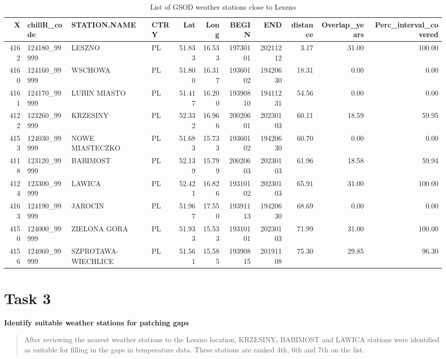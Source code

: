 \documentclass[
]{book}
\begin{document}
\begin{table}

\caption{\label{tab:unnamed-chunk-33}List of GSOD weather stations close to Leszno}
\fontsize{10}{12}\selectfont
\begin{tabular}[t]{r|l|l|l|r|r|r|r|r|r|r}
\hline
X & chillR\_code & STATION.NAME & CTRY & Lat & Long & BEGIN & END & distance & Overlap\_years & Perc\_interval\_covered\\
\hline
4162 & 124180\_99999 & LESZNO & PL & 51.833 & 16.533 & 19730101 & 20211212 & 3.17 & 31.00 & 100.00\\
\hline
4160 & 124160\_99999 & WSCHOWA & PL & 51.800 & 16.317 & 19360102 & 19420630 & 18.31 & 0.00 & 0.00\\
\hline
4161 & 124170\_99999 & LUBIN MIASTO & PL & 51.417 & 16.200 & 19390810 & 19411231 & 54.56 & 0.00 & 0.00\\
\hline
4122 & 123260\_99999 & KRZESINY & PL & 52.332 & 16.966 & 20020601 & 20230103 & 60.11 & 18.59 & 59.95\\
\hline
4153 & 124030\_99999 & NOWE MIASTECZKO & PL & 51.683 & 15.733 & 19360102 & 19420630 & 60.70 & 0.00 & 0.00\\
\hline
4118 & 123120\_99999 & BABIMOST & PL & 52.139 & 15.799 & 20020603 & 20230103 & 61.96 & 18.58 & 59.94\\
\hline
4124 & 123300\_99999 & LAWICA & PL & 52.421 & 16.826 & 19310102 & 20230103 & 65.91 & 31.00 & 100.00\\
\hline
4163 & 124190\_99999 & JAROCIN & PL & 51.967 & 17.550 & 19391113 & 19420630 & 68.69 & 0.00 & 0.00\\
\hline
4150 & 124000\_99999 & ZIELONA GORA & PL & 51.933 & 15.533 & 19310101 & 20230103 & 71.99 & 31.00 & 100.00\\
\hline
4156 & 124060\_99999 & SZPROTAWA-WIECHLICE & PL & 51.561 & 15.585 & 19390815 & 20191108 & 75.30 & 29.85 & 96.30\\
\hline
\end{tabular}
\end{table}

\hypertarget{task-3-3}{%
\section{Task 3}\label{task-3-3}}

\textbf{Identify suitable weather stations for patching gaps}

\begin{quote}
After reviewing the nearest weather stations to the Leszno location, KRZESINY, BABIMOST and LAWICA stations were identified as suitable for filling in the gaps in temperature data. These stations are ranked 4th, 6th and 7th on the list.
\end{quote}

  
\end{document}
